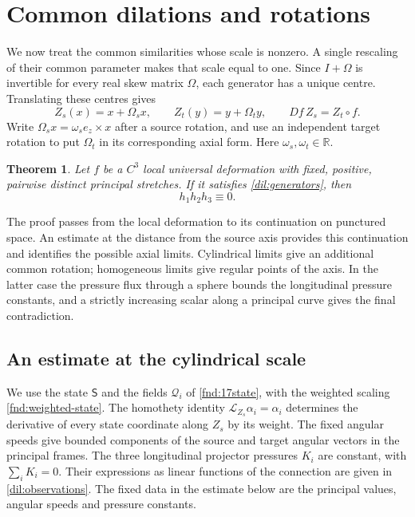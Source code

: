 \documentclass[11pt,a4paper]{article}
\numberwithin{equation}{section}
\theoremstyle{plain}
\newtheorem{theorem}{Theorem}[section]
\theoremstyle{definition}
\theoremstyle{remark}
\begin{document}
\section{Common dilations and rotations}\label{sec:dilation}

We now treat the common similarities whose scale is nonzero.  A single
rescaling of their common parameter makes that scale equal to one.
Since $I+\Omega$ is invertible for every real skew matrix $\Omega$, each
generator has a unique centre.  Translating these centres gives
\begin{equation}\label{dil:generators}
 Z_s(x)=x+\Omega_sx,\qquad Z_t(y)=y+\Omega_ty,
 \qquad Df\,Z_s=Z_t\circ f.
\end{equation}
Write $\Omega_sx=\omega_s e_z\times x$ after a source rotation, and use
an independent target rotation to put $\Omega_t$ in its corresponding
axial form.  Here $\omega_s,\omega_t\in\mathbb R$.

\begin{theorem}\label{dil:whole}
Let $f$ be a $C^3$ local universal deformation with fixed, positive,
pairwise distinct principal stretches.  If it satisfies
\eqref{dil:generators}, then
\[
                         h_1h_2h_3\equiv0.
\]

\end{theorem}

The proof passes from the local deformation to its continuation on
punctured space. An estimate at the distance from the source axis
provides this continuation and identifies the possible axial limits.
Cylindrical limits give an additional common rotation; homogeneous
limits give regular points of the axis. In the latter case the
pressure flux through a sphere bounds the longitudinal pressure
constants, and a strictly increasing scalar along a principal curve
gives the final contradiction.

\subsection{An estimate at the cylindrical scale}

We use the state $\mathsf S$ and the fields $\mathcal Q_i$ of
\eqref{fnd:17state}, with the weighted scaling
\eqref{fnd:weighted-state}.
The homothety identity $\mathcal L_{Z_s}\alpha_i=\alpha_i$ determines
the derivative of every state coordinate along $Z_s$ by its weight.
The fixed angular speeds give bounded components of the source and
target angular vectors in the principal frames. The three
longitudinal projector pressures $K_i$ are constant, with
$\sum_iK_i=0$. Their expressions as linear functions of the connection
are given in \eqref{dil:observations}. The fixed data in the estimate
below are the principal values, angular speeds and pressure constants.
\end{document}
